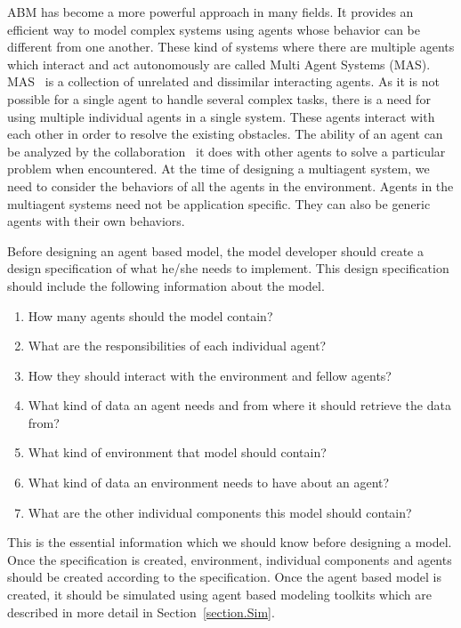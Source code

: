 ABM has become a more powerful approach in many fields. It provides an efficient way to model complex systems using agents whose behavior can be different from one another. These kind of systems where there are multiple agents which interact and act autonomously are called Multi Agent Systems (MAS). MAS~\cite{peer} is a collection of unrelated and dissimilar interacting agents. As it is not possible for a single agent to handle several complex tasks, there is a need for using multiple individual agents in a single system. These agents interact with each other in order to resolve the existing obstacles. The ability of an agent can be analyzed by the collaboration~\cite{Dunin2010} it does with other agents to solve a particular problem when encountered. At the time of designing a multiagent system, we need to consider the behaviors of all the agents in the environment. Agents in the multiagent systems need not be application specific. They can also be generic agents with their own behaviors. 

Before designing an agent based model, the model developer should create a design specification of what he/she needs to implement. This design specification should include the following information about the model. 

\vspace{3mm}
\begin{enumerate}
\item How many agents should the model contain?  
\item What are the responsibilities of each individual agent? 
\item How they should interact with the environment and fellow agents?
\item What kind of data an agent needs and from where it should retrieve the data from?
\item What kind of environment that model should contain? 
\item What kind of data an environment needs to have about an agent? 
\item What are the other individual components this model should contain?
\end{enumerate}

\vspace{5mm}

This is the essential information which we should know before designing a model. Once the specification is created, environment, individual components and agents should be created according to the specification. Once the agent based model is created, it should be simulated using agent based modeling toolkits which are described in more detail in Section~\ref{section.Sim}.
 
